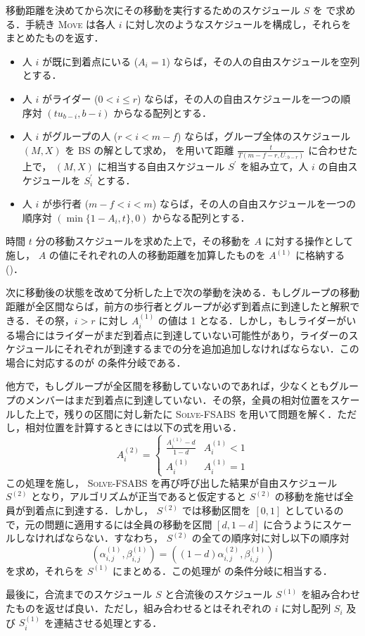 移動距離を決めてから次にその移動を実行するためのスケジュール $S$ を  で求める．手続き \textsc{Move} は各人 $i$ に対し次のようなスケジュールを構成し，それらをまとめたものを返す．
\begin{itemize}
\item 人 $i$ が既に到着点にいる ($A_i = 1$) ならば，その人の自由スケジュールを空列とする．
\item 人 $i$ がライダー ($0 < i \leq r$) ならば，その人の自由スケジュールを一つの順序対 $(tu_{b-i}, b-i)$ からなる配列とする．
\item 人 $i$ がグループの人 ($r < i < m - f$) ならば，グループ全体のスケジュール $(M, X)$ を BS の解として求め，  を用いて距離 $\frac{t}{T(m - f - r, U_{:b-r})}$ に合わせた上で， $(M, X)$ に相当する自由スケジュール $S^\prime$ を組み立て，人 $i$ の自由スケジュールを $S^\prime_i$ とする．
\item 人 $i$ が歩行者 ($m - f < i < m$) ならば，その人の自由スケジュールを一つの順序対 $(\min \{ 1 - A_i, t \}, 0)$ からなる配列とする．
\end{itemize}
時間 $t$ 分の移動スケジュールを求めた上で，その移動を $A$ に対する操作として施し， $A$ の値にそれぞれの人の移動距離を加算したものを $A^{(1)}$ に格納する ()．

次に移動後の状態を改めて分析した上で次の挙動を決める．もしグループの移動距離が全区間ならば，前方の歩行者とグループが必ず到着点に到達したと解釈できる．その祭，$i > r$ に対し $A^{(1)}_i$ の値は 1 となる．しかし，もしライダーがいる場合にはライダーがまだ到着点に到達していない可能性があり，ライダーのスケジュールにそれぞれが到達するまでの分を追加追加しなければならない．この場合に対応するのが  の条件分岐である．

他方で，もしグループが全区間を移動していないのであれば，少なくともグループのメンバーはまだ到着点に到達していない．その祭，全員の相対位置をスケールした上で，残りの区間に対し新たに \textsc{Solve-FSABS} を用いて問題を解く．ただし，相対位置を計算するときには以下の式を用いる．
\begin{equation}
  A^{(2)}_i = \begin{cases}
    \frac{A^{(1)}_i - d}{1 - d} & A^{(1)}_i < 1 \\
    A^{(1)}_i & A^{(1)}_i = 1
  \end{cases}
\end{equation}
この処理を施し， \textsc{Solve-FSABS} を再び呼び出した結果が自由スケジュール $S^{(2)}$ となり，アルゴリズムが正当であると仮定すると $S^{(2)}$ の移動を施せば全員が到着点に到達する．しかし， $S^{(2)}$ では移動区間を $[0, 1]$ としているので，元の問題に適用するには全員の移動を区間 $[d, 1 -d]$ に合うようにスケールしなければならない．すなわち， $S^{(2)}$ の全ての順序対に対し以下の順序対
\begin{equation}
  (\alpha^{(1)}_{i, j}, \beta^{(1)}_{i,j}) = ((1 - d)\alpha^{(2)}_{i,j}, \beta^{(1)}_{i,j})
\end{equation}
を求め，それらを $S^{(1)}$ にまとめる．この処理が  の条件分岐に相当する．

最後に，合流までのスケジュール $S$ と合流後のスケジュール $S^{(1)}$ を組み合わせたものを返せば良い．ただし，組み合わせるとはそれぞれの $i$ に対し配列 $S_i$ 及び $S^{(1)}_i$ を連結させる処理とする．
